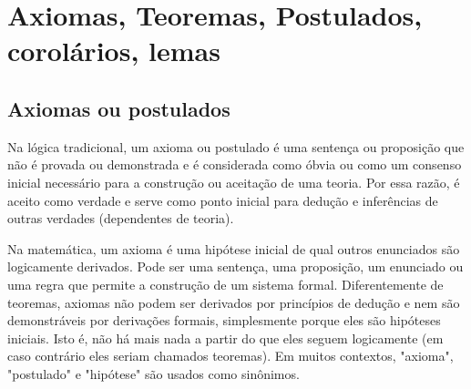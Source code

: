 
\cleardoublepage
{} %

\chapter{Axiomas, Teoremas, Postulados, corolários, lemas}
\label{cap_exemplos}

\begin{flushright}
	\showfont
\end{flushright}

\newpage


\section{Axiomas ou postulados}

Na lógica tradicional, um axioma ou postulado é uma sentença ou proposição que não é provada ou demonstrada e é considerada como óbvia ou como um consenso inicial necessário para a construção ou aceitação de uma teoria. Por essa razão, é aceito como verdade e serve como ponto inicial para dedução e inferências de outras verdades (dependentes de teoria).


Na matemática, um axioma é uma hipótese inicial de qual outros enunciados são logicamente derivados. Pode ser uma sentença, uma proposição, um enunciado ou uma regra que permite a construção de um sistema formal. Diferentemente de teoremas, axiomas não podem ser derivados por princípios de dedução e nem são demonstráveis por derivações formais, simplesmente porque eles são hipóteses iniciais. Isto é, não há mais nada a partir do que eles seguem logicamente (em caso contrário eles seriam chamados teoremas). Em muitos contextos, "axioma", "postulado" e "hipótese" são usados como sinônimos.


